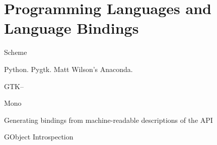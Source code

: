 \chapter{Programming Languages and Language Bindings}

Scheme

Python.  Pygtk.  Matt Wilson's Anaconda.

GTK--

Mono

Generating bindings from machine-readable descriptions of the API

GObject Introspection

